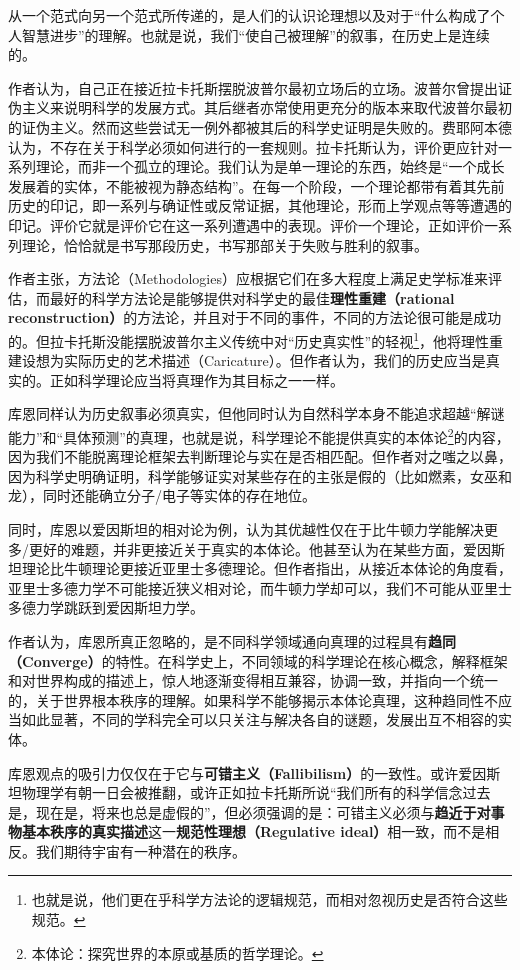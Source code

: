 \documentclass[12pt, a4paper, oneside]{ctexart}
\renewcommand{\b}{\textbf}
\newcommand{\f}{\footnote}
\begin{document}
从一个范式向另一个范式所传递的，是人们的认识论理想以及对于“什么构成了个人智慧进步”的理解。也就是说，我们“使自己被理解”的叙事，在历史上是连续的。

作者认为，自己正在接近拉卡托斯摆脱波普尔最初立场后的立场。波普尔曾提出证伪主义来说明科学的发展方式。其后继者亦常使用更充分的版本来取代波普尔最初的证伪主义。然而这些尝试无一例外都被其后的科学史证明是失败的。费耶阿本德认为，不存在关于科学必须如何进行的一套规则。拉卡托斯认为，评价更应针对一系列理论，而非一个孤立的理论。我们认为是单一理论的东西，始终是“一个成长发展着的实体，不能被视为静态结构”。在每一个阶段，一个理论都带有着其先前历史的印记，即一系列与确证性或反常证据，其他理论，形而上学观点等等遭遇的印记。评价它就是评价它在这一系列遭遇中的表现。评价一个理论，正如评价一系列理论，恰恰就是书写那段历史，书写那部关于失败与胜利的叙事。

作者主张，方法论（Methodologies）应根据它们在多大程度上满足史学标准来评估，而最好的科学方法论是能够提供对科学史的最佳\b{理性重建（rational reconstruction）}的方法论，并且对于不同的事件，不同的方法论很可能是成功的。但拉卡托斯没能摆脱波普尔主义传统中对“历史真实性”的轻视\f{也就是说，他们更在乎科学方法论的逻辑规范，而相对忽视历史是否符合这些规范。}，他将理性重建设想为实际历史的艺术描述（Caricature）。但作者认为，我们的历史应当是真实的。正如科学理论应当将真理作为其目标之一一样。

库恩同样认为历史叙事必须真实，但他同时认为自然科学本身不能追求超越“解谜能力”和“具体预测”的真理，也就是说，科学理论不能提供真实的本体论\f{本体论：探究世界的本原或基质的哲学理论。}的内容，因为我们不能脱离理论框架去判断理论与实在是否相匹配。但作者对之嗤之以鼻，因为科学史明确证明，科学能够证实对某些存在的主张是假的（比如燃素，女巫和龙），同时还能确立分子/电子等实体的存在地位。

同时，库恩以爱因斯坦的相对论为例，认为其优越性仅在于比牛顿力学能解决更多/更好的难题，并非更接近关于真实的本体论。他甚至认为在某些方面，爱因斯坦理论比牛顿理论更接近亚里士多德理论。但作者指出，从接近本体论的角度看，亚里士多德力学不可能接近狭义相对论，而牛顿力学却可以，我们不可能从亚里士多德力学跳跃到爱因斯坦力学。

作者认为，库恩所真正忽略的，是不同科学领域通向真理的过程具有\b{趋同（Converge）}的特性。在科学史上，不同领域的科学理论在核心概念，解释框架和对世界构成的描述上，惊人地逐渐变得相互兼容，协调一致，并指向一个统一的，关于世界根本秩序的理解。如果科学不能够揭示本体论真理，这种趋同性不应当如此显著，不同的学科完全可以只关注与解决各自的谜题，发展出互不相容的实体。

库恩观点的吸引力仅仅在于它与\b{可错主义（Fallibilism）}的一致性。或许爱因斯坦物理学有朝一日会被推翻，或许正如拉卡托斯所说“我们所有的科学信念过去是，现在是，将来也总是虚假的”，但必须强调的是：可错主义必须与\b{趋近于对事物基本秩序的真实描述}这一\b{规范性理想（Regulative ideal）}相一致，而不是相反。我们期待宇宙有一种潜在的秩序。
\end{document}
